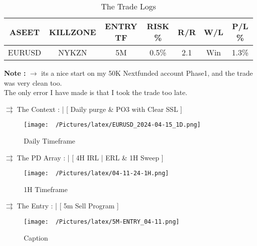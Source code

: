 \documentclass{article}
\begin{document}
\begin{table}[h!]
\begin{center}
\caption{The Trade Logs}
\label{tab:my_label}
  \vspace{0.3cm}
\begin{tabular}{|c|c|c|c|c|c|c|}
\toprule
  \textbf{ASEET} & \textbf{KILLZONE} & \textbf{ENTRY TF}  & \textbf{RISK \%} & \textbf{R/R} & \textbf{W/L} & \textbf{P/L \%} \\
\midrule
  EURUSD & NYKZN & 5M & 0.5\% & 2.1 & Win & 1.3\% \\
\bottomrule
\end{tabular}
\end{center}
\end{table}


\begin{center}
\begin{mdframed}[style=MyQuoteFrame]
\textbf{Note :} $\rightarrow$ its a nice start on my 50K Nextfunded account Phase1, and the trade was very clean too. \\ 
The only error I have made is that I took the trade too late.
\end{mdframed}
\end{center}
\vspace{0.2cm}

\newpage

\noindent \( \rightrightarrows \) \hspace{0.1cm}The Context : | [ Daily purge \& PO3 with Clear SSL ] 
\begin{figure}[h!]
  \begin{adjustbox}{width=1.1\textwidth,center}
  \texttt{[image: ~/Pictures/latex/EURUSD\_2024-04-15\_1D.png]}
\end{adjustbox}
\caption{Daily Timeframe}
\label{fig:image}
\end{figure}


\noindent \( \rightrightarrows \) \hspace{0.1cm}The PD Array : | [ 4H IRL | ERL \& 1H Sweep ]
\begin{figure}[h!]
  \begin{adjustbox}{width=1.1\textwidth,center}
  \texttt{[image: ~/Pictures/latex/04-11-24-1H.png]}
\end{adjustbox}
\caption{1H Timeframe}
\label{fig:image}
\end{figure}

\newpage

\noindent \( \rightrightarrows \) \hspace{0.1cm}The Entry : | [ 5m Sell Program ]
\begin{figure}[h!]
  \begin{adjustbox}{width=1.2\textwidth,center}
  \texttt{[image: ~/Pictures/latex/5M-ENTRY\_04-11.png]}
\end{adjustbox}
\caption{Caption}
\label{fig:image}
\end{figure}
\end{document}
